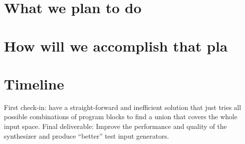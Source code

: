 \documentclass[review, sigplan]{acmart}
\begin{document}
\section*{What we plan to do}

\section*{How will we accomplish that pla }

\section{Timeline}
First check-in: have a straight-forward and inefficient solution that just tries all possible combinations of program blocks to find a union that covers the whole input space.
Final deliverable: Improve the performance and quality of the synthesizer and produce “better” test input generators.




\end{document}
